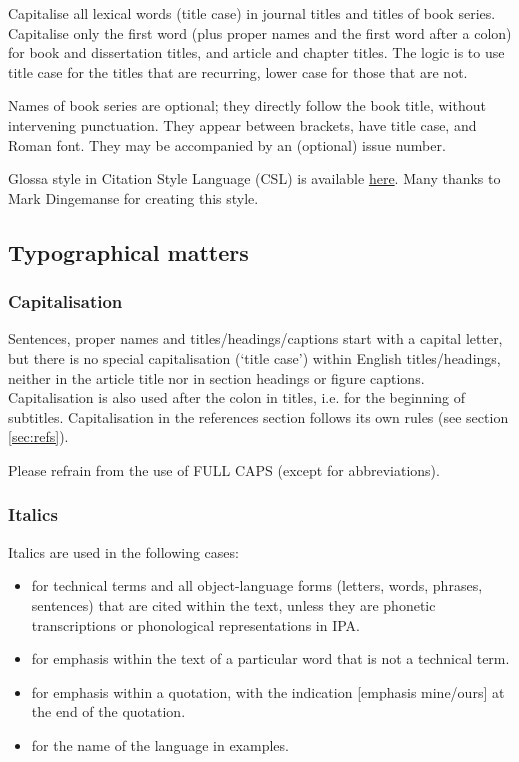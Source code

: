 \documentclass[charis,linguex,biblatex]{glossa}
\begin{document}
Capitalise all lexical words (title case) in journal titles and titles of book series. Capitalise only the first word (plus proper names and the first word after a colon) for book and dissertation titles, and article and chapter titles. The logic is to use title case for the titles that are recurring, lower case for those that are not.

Names of book series are optional; they directly follow the book title, without intervening punctuation. They appear between brackets, have title case, and Roman font. They may be accompanied by an (optional) issue number.

Glossa style in Citation Style Language (CSL) is available \href{https://www.zotero.org/styles?q=Glossa}{here}. Many thanks to Mark Dingemanse for creating this style.


\subsection{Typographical matters}

\subsubsection{Capitalisation}

Sentences, proper names and titles/headings/captions start with a capital letter, but there is no special capitalisation (`title case') within English titles/headings, neither in the article title nor in section headings or figure captions. Capitalisation is also used after the colon in titles, i.e. for the beginning of subtitles. Capitalisation in the references section follows its own rules (see section \ref{sec:refs}).


Please refrain from the use of FULL CAPS (except for abbreviations).

\subsubsection{Italics}
Italics are used in the following cases:
\sloppy
\begin{itemize}
\item for technical terms and all object-language forms (letters, words, phrases, sentences) that are cited within the text, unless they are phonetic transcriptions or phonological representations in IPA.
\item for emphasis within the text of a particular word that is not a technical term.
\item for emphasis within a quotation, with the indication [emphasis mine/ours] at the end of the quotation.
\item for the name of the language in examples.
\end{itemize}
\end{document}
